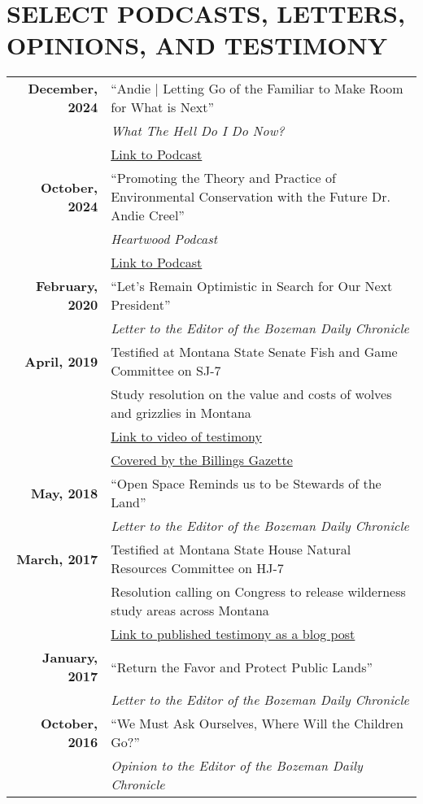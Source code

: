 \documentclass[11pt]{article}
\begin{document}
\section*{SELECT PODCASTS, LETTERS, OPINIONS, AND TESTIMONY}
\begin{tabularx}{\linewidth}{>{\bfseries}r X} %
December, 2024 & “Andie | Letting Go of the Familiar to Make Room for What is Next” \\
    & \textit{What The Hell Do I Do Now?}\\
    & \href{https://open.spotify.com/episode/7bswDIxoYApUMYuF7UPw6C?si=b8d9c4fdcc804742}{Link to Podcast} \\[1ex]
October, 2024 & “Promoting the Theory and Practice of Environmental Conservation with the Future Dr. Andie Creel” \\
    & \textit{Heartwood Podcast} \\
    & \href{https://podcasts.apple.com/us/podcast/heartwood/id1474971310?i=1000673543724}{Link to Podcast} \\[1ex]
February, 2020 & “Let’s Remain Optimistic in Search for Our Next President” \\
    & \textit{Letter to the Editor of the Bozeman Daily Chronicle} \\[1ex]
April, 2019 & Testified at Montana State Senate Fish and Game Committee on SJ-7 \\
    & Study resolution on the value and costs of wolves and grizzlies in Montana \\
    & \href{https://www.facebook.com/watch/?v=2242142425832448}{Link to video of testimony} \\
    & \href{https://billingsgazette.com/outdoors/montana-could-study-of-economic-costs-benefits-of-wolves-grizzlies/article_4cba1d42-20a7-535b-a06c-49b800b1fe67.html?fbclid=IwAR2AH4iV9oVMiqb84HeFRVAxnHxhk-furTRHPYwgPYg9yOZv9gZg9rW6eJ4}{Covered by the Billings Gazette} \\[1ex]
May, 2018 & “Open Space Reminds us to be Stewards of the Land” \\
    & \textit{Letter to the Editor of the Bozeman Daily Chronicle}\\[1ex]
March, 2017 & Testified at Montana State House Natural Resources Committee on HJ-7 \\
    & Resolution calling on Congress to release wilderness study areas across Montana \\
    & \href{https://linktoblogpost.com}{Link to published testimony as a blog post} \\[1ex]
January, 2017 & “Return the Favor and Protect Public Lands” \\
    & \textit{Letter to the Editor of the Bozeman Daily Chronicle} \\[1ex]
October, 2016 & “We Must Ask Ourselves, Where Will the Children Go?” \\
    & \textit{Opinion to the Editor of the Bozeman Daily Chronicle} \\
\end{tabularx}
\end{document}
